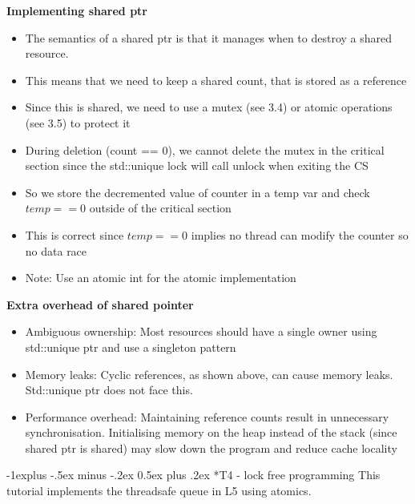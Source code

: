 \documentclass[10pt, landscape]{article}
\makeatletter
\renewcommand{\subsection}{\@startsection{subsection}{2}{0mm}%
                                {-1explus -.5ex minus -.2ex}%
                                {0.5ex plus .2ex}%
                                {\normalfont\normalsize\bfseries}}
\makeatother
\begin{document}
\begin{multicols}{4}
\textbf{Implementing shared ptr} \\
\begin{itemize}
    \item The semantics of a shared ptr is that it manages when to destroy a shared resource.
    \item This means that we need to keep a shared count, that is stored as a reference
    \item Since this is shared, we need to use a mutex (see 3.4) or atomic operations (see 3.5) to protect it
    \item During deletion (count == 0), we cannot delete the mutex in the critical section since the std::unique lock will call unlock when exiting the CS
    \item So we store the decremented value of counter in a temp var and check $temp==0$ outside of the critical section
    \item This is correct since $temp==0$ implies no thread can modify the counter so no data race
    \item Note: Use an atomic int for the atomic implementation
\end{itemize}

\textbf{Extra overhead of shared pointer} \\
\begin{itemize}
    \item Ambiguous ownership: Most resources should have a single owner using std::unique ptr and use a singleton pattern
    \item Memory leaks: Cyclic references, as shown above, can cause memory leaks. Std::unique ptr does not face this. 
    \item Performance overhead: Maintaining reference counts result in unnecessary synchronisation. Initialising memory on the heap instead of the stack (since shared ptr is shared) may slow down the program and reduce cache locality
\end{itemize}

\subsection*{T4 - lock free programming} 
This tutorial implements the threadsafe queue in L5 using atomics.\\


\end{multicols}
\end{document}
